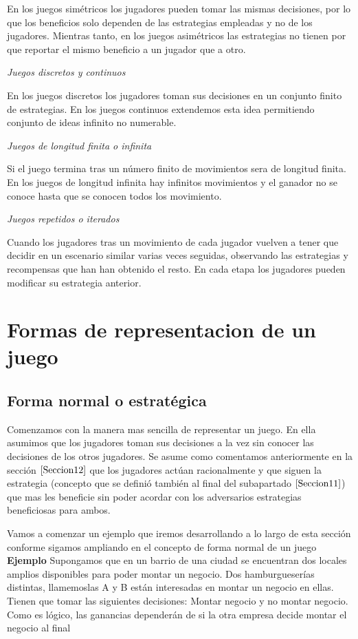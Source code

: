 \documentclass[12pt,a4paper,]{book}
\numberwithin{dummy}{section}
\theoremstyle{ocrenumbox}
\theoremstyle{blacknumex}
\theoremstyle{blacknumbox}
\theoremstyle{ocrenum}
\theoremstyle{ocrenum}
\begin{document}
En los juegos simétricos los jugadores pueden tomar las mismas
decisiones, por lo que los beneficios solo dependen de las estrategias
empleadas y no de los jugadores. Mientras tanto, en los juegos
asimétricos las estrategias no tienen por que reportar el mismo
beneficio a un jugador que a otro.

\emph{Juegos discretos y continuos}

En los juegos discretos los jugadores toman sus decisiones en un
conjunto finito de estrategias. En los juegos continuos extendemos esta
idea permitiendo conjunto de ideas infinito no numerable.

\emph{Juegos de longitud finita o infinita}

Si el juego termina tras un número finito de movimientos sera de
longitud finita. En los juegos de longitud infinita hay infinitos
movimientos y el ganador no se conoce hasta que se conocen todos los
movimiento.

\emph{Juegos repetidos o iterados}

Cuando los jugadores tras un movimiento de cada jugador vuelven a tener
que decidir en un escenario similar varias veces seguidas, observando
las estrategias y recompensas que han han obtenido el resto. En cada
etapa los jugadores pueden modificar su estrategia anterior.

\hypertarget{Seccion22}{%
\section{Formas de representacion de un juego}\label{Seccion22}}

\hypertarget{Seccion221}{%
\subsection{Forma normal o estratégica}\label{Seccion221}}

Comenzamos con la manera mas sencilla de representar un juego. En ella
asumimos que los jugadores toman sus decisiones a la vez sin conocer las
decisiones de los otros jugadores. Se asume como comentamos
anteriormente en la sección \(\ref{Seccion12}\) que los jugadores actúan
racionalmente y que siguen la estrategia (concepto que se definió
también al final del subapartado \(\ref{Seccion11}\)) que mas les
beneficie sin poder acordar con los adversarios estrategias beneficiosas
para ambos.

Vamos a comenzar un ejemplo que iremos desarrollando a lo largo de esta
sección conforme sigamos ampliando en el concepto de forma normal de un
juego \textbf{Ejemplo} Supongamos que en un barrio de una ciudad se
encuentran dos locales amplios disponibles para poder montar un negocio.
Dos hamburgueserías distintas, llamemoslas A y B están interesadas en
montar un negocio en ellas. Tienen que tomar las siguientes decisiones:
Montar negocio y no montar negocio. Como es lógico, las ganancias
dependerán de si la otra empresa decide montar el negocio al final
\end{document}
